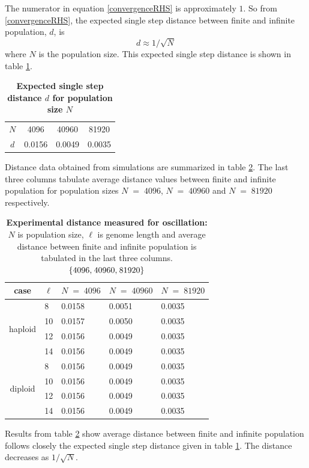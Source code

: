 The numerator in equation \ref{convergenceRHS} is approximately $1$. 
So from \ref{convergenceRHS}, the expected single step distance between finite and infinite population, $d$, is
\[
d \approx 1/\sqrt{N}
\]
where $N$ is the population size.
This expected single step distance is shown in table \ref{tableExpectedDistance}.
\begin{table}[ht]
\caption{\textbf{Expected single step distance $d$ for population size $N$}}
\centering
\begin{tabular}{c c c c}
\hline
$N$ & 4096 & 40960 & 81920 \\
$d$ & 0.0156 & 0.0049 & 0.0035 \\
\hline
\end{tabular}
\label{tableExpectedDistance}
\end{table}
Distance data obtained from simulations are summarized in table \ref{tableDistanceOsc}. The 
last three columns tabulate average distance values between finite and infinite population 
for population sizes $N \;=\; 4096 $, $N \;=\; 40960 $ and $N \;=\; 81920 $ respectively.
\begin{table}[ht]
\caption{\textbf{Experimental distance measured for oscillation:} $N$ is population size, $\ell$ is genome length 
and average distance between finite and infinite population is tabulated in the last three columns. $\{4096, \hspace{0.01in} 40960, \hspace{0.01in} 81920\}$ }
\centering
\begin{tabularx}{0.75\textwidth}{ c *{4}{X}}
\toprule
case & $\ell$ & $N \;=\; 4096 $ & $N \;=\; 40960 $ & $N \;=\; 81920 $\\
\midrule
\multirow{4}{*}{haploid} 	& 8 & 0.0158 & 0.0051 & 0.0035 \\
 				& 10 & 0.0157 & 0.0050 & 0.0035 \\ 
 			 	& 12 & 0.0156 & 0.0049 & 0.0035 \\
 	 			& 14 & 0.0156 & 0.0049 & 0.0035 \\ 
\midrule
\multirow{4}{*}{diploid} 	& 8 & 0.0156 & 0.0049 & 0.0035 \\
				& 10 & 0.0156 & 0.0049 & 0.0035 \\
			 	& 12 & 0.0156 & 0.0049 & 0.0035 \\
	 			& 14 & 0.0156 & 0.0049 & 0.0035 \\
\bottomrule

\end{tabularx}
\label{tableDistanceOsc}
\end{table}
Results from table \ref{tableDistanceOsc} show average distance between finite and infinite population follows closely 
the expected single step distance given in table \ref{tableExpectedDistance}. The distance decreases as $1/\sqrt{N}$.

